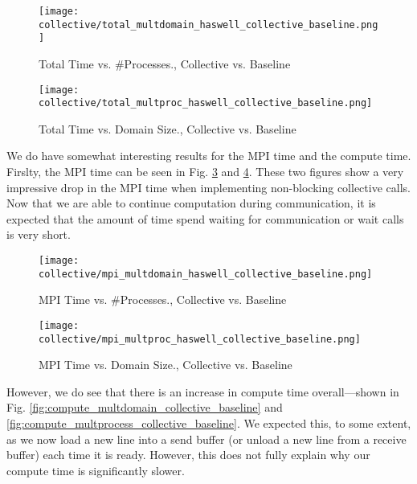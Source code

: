 \begin{enumerate}
	\begin{figure}[h] %
		\centering
		\texttt{[image: collective/total\_multdomain\_haswell\_collective\_baseline.png]}
		\caption{Total Time vs. \#Processes., Collective vs. Baseline}
		\label{fig:total_multdomain_collective_baseline}
	\end{figure}	
	
	\begin{figure}[h] %
		\centering
		\texttt{[image: collective/total\_multproc\_haswell\_collective\_baseline.png]}
		\caption{Total Time vs. Domain Size., Collective vs. Baseline}
		\label{fig:total_multprocess_collective_baseline}
	\end{figure}	
    
    We do have somewhat interesting results for the MPI time and the compute time.
    Firslty, the MPI time can be seen in Fig. \ref{fig:mpi_multdomain_collective_baseline} and
	\ref{fig:mpi_multprocess_collective_baseline}. These two figures show a very impressive
	drop in the MPI time when implementing non-blocking collective calls. Now that we are able
	to continue computation during communication, it is expected that the amount of time spend
	waiting for communication or wait calls is very short.
	
	\begin{figure}[h] %
		\centering
		\texttt{[image: collective/mpi\_multdomain\_haswell\_collective\_baseline.png]}
		\caption{MPI Time vs. \#Processes., Collective vs. Baseline}
		\label{fig:mpi_multdomain_collective_baseline}
	\end{figure}	
	
	\begin{figure}[h] %
		\centering
		\texttt{[image: collective/mpi\_multproc\_haswell\_collective\_baseline.png]}
		\caption{MPI Time vs. Domain Size., Collective vs. Baseline}
		\label{fig:mpi_multprocess_collective_baseline}
	\end{figure}	
	
 	However, we do see that there is an increase in compute time 
 	overall---shown in Fig. \ref{fig:compute_multdomain_collective_baseline} and
	\ref{fig:compute_multprocess_collective_baseline}. We expected this, to some extent, as we now load a new 
	line into a send buffer (or unload a new line from a receive buffer) each time it is ready. However,
	this does not fully explain why our compute time is significantly slower.
	

\end{enumerate}

